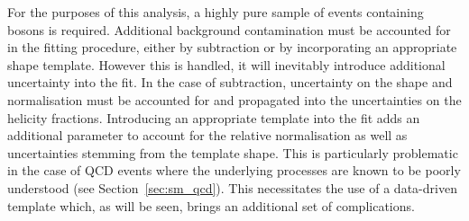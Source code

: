 For the purposes of this analysis, a highly pure sample of events containing \PW
bosons is required. Additional background contamination must be accounted for in
the fitting procedure, either by subtraction or by incorporating an appropriate
shape template. However this is handled, it will inevitably introduce additional
uncertainty into the fit. In the case of subtraction, uncertainty on the shape
and normalisation must be accounted for and propagated into the uncertainties on
the helicity fractions. Introducing an appropriate template into the fit adds an
additional parameter to account for the relative normalisation as well as
uncertainties stemming from the template shape. This is particularly problematic
in the case of \ac{QCD} events where the underlying processes are known to be
poorly understood (see Section~\ref{sec:sm_qcd}). This necessitates the use of a
data-driven template which, as will be seen, brings an additional set of
complications.

